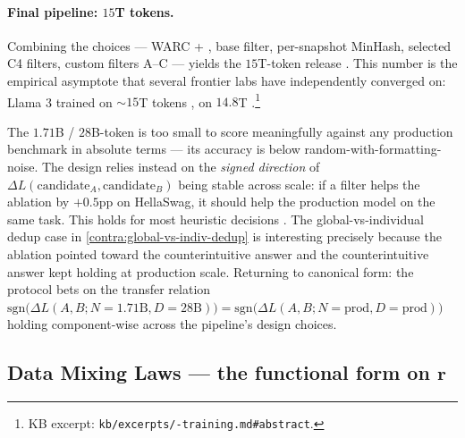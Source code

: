 \paragraph{Final pipeline: $15$T tokens.}
Combining the choices --- WARC + , base filter,
per-snapshot MinHash, selected C4 filters, custom filters A--C ---
yields the $15$T-token  release
\citep[\S 3.7]{fineweb2024}. This number is the empirical asymptote
that several frontier labs have independently converged on: Llama 3
trained on $\sim 15$T tokens \citep{meta-llama3},  on
$14.8$T \citep[abstract]{deepseek-v3}.\footnote{KB excerpt:
\texttt{kb/excerpts/-training.md\#abstract}.}

\begin{intuition}
\label{intuit:ablation-meter}
The $1.71$B / $28$B-token  is too small to score
meaningfully against any production benchmark in absolute terms ---
its  accuracy is below random-with-formatting-noise. The design
relies instead on the \emph{signed direction} of
$\Delta L(\text{candidate}_A, \text{candidate}_B)$ being stable
across scale: if a filter helps the ablation by $+0.5$pp on
HellaSwag, it should help the production model on the same task.
This holds for most heuristic decisions \citep[\S 3.1]{fineweb2024}.
The global-vs-individual dedup case in
\cref{contra:global-vs-indiv-dedup} is interesting precisely because
the ablation pointed toward the counterintuitive answer and the
counterintuitive answer kept holding at production scale. Returning
to canonical form: the protocol bets on the transfer relation
$\mathrm{sgn}\bigl(\Delta L(A, B; N{=}1.71\text{B}, D{=}28\text{B})\bigr) =
\mathrm{sgn}\bigl(\Delta L(A, B; N{=}\text{prod}, D{=}\text{prod})\bigr)$
holding component-wise across the pipeline's design choices.
\end{intuition}

\subsection{Data Mixing Laws --- the functional form on $\mathbf{r}$}
\label{sec:data-mixing}

